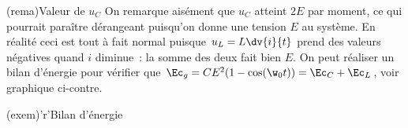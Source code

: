 \documentclass[../../main/main.tex]{subfiles}
\begin{document}
\begin{tcbraster}[raster columns=2, raster equal height=rows, space to=\myspace]
	\begin{tcb}[label=rema:lccharge, ](rema){Valeur de $u_C$}
		On remarque aisément que $u_C$ atteint $2E$ par moment, ce qui pourrait
		paraître dérangeant puisqu'on donne une tension $E$ au système. En
		réalité ceci est tout à fait normal puisque $u_L = L\dv{i}{t}$ prend des
		valeurs négatives quand $i$ diminue~: la somme des deux fait bien $E$.
		\bigbreak
		On peut réaliser un bilan d'énergie pour vérifier que $\Ec_g =
			CE^2(1-\cos(\w_0t)) = \Ec_C + \Ec_L$, voir graphique ci-contre.
	\end{tcb}
	\begin{tcb}[add to natural height=\myspace](exem)'r'{Bilan d'énergie}
		\begin{center}
		\end{center}
	\end{tcb}
\end{tcbraster}
\end{document}
